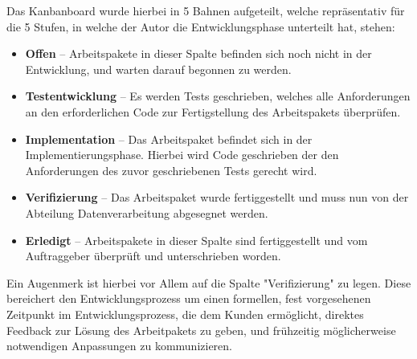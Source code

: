 Das Kanbanboard wurde hierbei in 5 Bahnen aufgeteilt, welche repräsentativ für
die 5 Stufen, in welche der Autor die Entwicklungsphase unterteilt hat, stehen:
\begin{itemize}
    \item \textbf{Offen} -- Arbeitspakete in dieser Spalte befinden sich noch
    nicht in der Entwicklung, und warten darauf begonnen zu werden.
    \item \textbf{Testentwicklung} -- Es werden Tests geschrieben, welches alle
    Anforderungen an den erforderlichen Code zur Fertigstellung des Arbeitspakets
    überprüfen.
    \item \textbf{Implementation} -- Das Arbeitspaket befindet sich in der
    Implementierungsphase. Hierbei wird Code geschrieben der den Anforderungen
    des zuvor geschriebenen Tests gerecht wird.
    \item \textbf{Verifizierung} -- Das Arbeitspaket wurde fertiggestellt und
    muss nun von der Abteilung Datenverarbeitung abgesegnet werden.
    \item \textbf{Erledigt} -- Arbeitspakete in dieser Spalte sind fertiggestellt
    und vom Auftraggeber überprüft und unterschrieben worden.
\end{itemize}

Ein Augenmerk ist hierbei vor Allem auf die Spalte "Verifizierung" zu legen.
Diese bereichert den Entwicklungsprozess um einen formellen, fest vorgesehenen
Zeitpunkt im Entwicklungsprozess, die dem Kunden ermöglicht, direktes Feedback
zur Lösung des Arbeitpakets zu geben, und frühzeitig möglicherweise notwendigen
Anpassungen zu kommunizieren.\par

